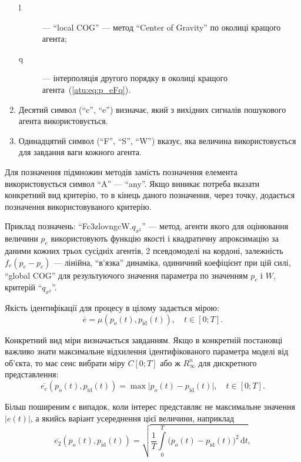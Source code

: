 \documentclass[a4paper,13pt]{atuaref}
\begin{document}
\begin{enumerate}
\begin{description}
      \item[l] --- ``local COG'' ---
        метод ``Center of Gravity'' по околиці кращого агента;

      \item[q] ---
        інтерполяція другого порядку в околиці кращого агента~(\ref{atu:eq:p_eFq}).

    \end{description}

  \item
    Десятий символ (``c'', ``e'') визначає, який з вихідних сигналів пошукового агента використовується.

  \item
    Одинадцятий символ (``F'', ``S'', ``W'') вказує, яка величина використовується для завдання ваги кожного агента.


\end{enumerate}
%
Для позначення підмножин методів замість позначення елемента використовується символ ``A'' --- ``any''.
Якщо виникає потреба вказати конкретний вид критерію, то в кінець даного
позначення, через точку, додається позначення використовуваного критерію.

Приклад позначень:
``Fc3zlovngcW.$q_{x^2}$''
--- метод, агенти якого для оцінювання величини $ p_e $ використовують функцію
якості і квадратичну апроксимацію за даними кожних трьох сусідніх агентів, 2
псевдомоделі на кордоні, залежність $ f_e (p_e-p_c) $ --- лінійна, ``в'язка''
динаміка, одиничний коефіцієнт при цій силі, ``global COG'' для результуючого
значення параметра по значенням $p_c$ і $W$, критерій
``$q_{x^2}$''.


Якість ідентифікації для процесу в цілому задається мірою:
%
\[
  \overline{e} = \mu( p_o(t), p_\mathrm{id}(t) ),
  \quad
  t \in [0;T].
\]

Конкретний вид міри визначається завданням. Якщо в конкретній постановці
важливо знати максимальне відхилення ідентифікованого параметра моделі від
об'єкта, то має сенс вибрати міру $ C[0; T] $ або ж $ R_{\infty}^n$ для
дискретного представлення:
%
\begin{equation}
  \overline{e_c}(p_o(t),p_\mathrm{id}(t))
  =
  \max \big| p_o(t)-p_\mathrm{id}(t) \big|,
  \quad
  t \in [0;T].
  \label{atu:eq:e_c}
\end{equation}

Більш поширеним є випадок, коли інтерес представляє не максимальне значення
$ |e(t)| $, а якийсь варіант усереднення цієї величини, наприклад
%
\begin{equation}
  \overline{e_2}(p_o(t),p_\mathrm{id}(t))
  =
  \sqrt{ \frac{1}{T} \int\limits_{0}^{T} \big( p_o(t)-p_\mathrm{id}(t) \big)^2 \, \mathrm{d}t },
  \label{atu:eq:e_2}
\end{equation}
\end{document}
